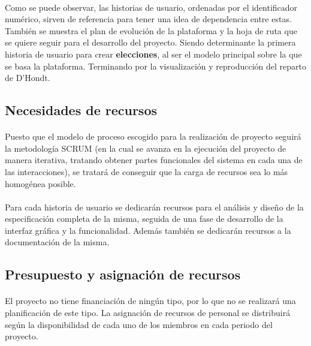 \documentclass{article}
\begin{document}
            \paragraph{}
            Como se puede observar, las historias de usuario, ordenadas por el identificador numérico, sirven de referencia para tener una idea de dependencia entre estas. También se muestra el plan de evolución de la plataforma y la hoja de ruta que se quiere seguir para el desarrollo del proyecto. Siendo determinante la primera historia de usuario para crear \textbf{elecciones}, al ser el modelo principal sobre la que se basa la plataforma. Terminando por la visualización y reproducción del reparto de D'Hondt.

       	\subsection{Necesidades de recursos}
        
        	\paragraph{}
			Puesto que el modelo de proceso escogido para la realización de proyecto seguirá la metodología SCRUM (en la cual se avanza en la ejecución del proyecto de manera iterativa, tratando obtener partes funcionales del sistema en cada una de las interacciones), se tratará de conseguir que la carga de recursos sea lo más homogénea posible. 
            
        	\paragraph{}
			Para cada historia de usuario se dedicarán recursos para el análisis y diseño de la especificación completa de la misma, seguida de una fase de desarrollo de la interfaz gráfica y la funcionalidad. Además también se dedicarán recursos a la documentación de la misma.



       	\subsection{Presupuesto y asignación de recursos}

			\paragraph{}
            El proyecto no tiene financiación de ningún tipo, por lo que no se realizará una planificación de este tipo. La asignación de recursos de personal se distribuirá según la disponibilidad de cada uno de los miembros en cada periodo del proyecto.
\end{document}
